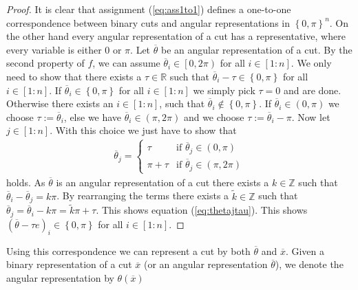 \documentclass[12pt,a4paper]{article}
\theoremstyle{mythm}
\begin{document}
\begin{proof}
It is clear that assignment (\ref{eq:ass1to1}) defines a one-to-one correspondence between binary cuts and angular representations in $ \left\{ 0, \pi  \right\} ^{ n }  $.
On the other hand every angular representation of a cut has a representative, where every variable is either $ 0 $ or $ \pi $.
Let $ \overline{ \theta}   $ be an angular representation of a cut. 
By the second property of $ f $, we can assume $ \overline{ \theta}_i  \in \left[ 0, 2 \pi \right)  $ for all $ i \in \left[ 1:n \right]  $.
We only need to show that there exists a $ \tau \in \mathbb{R} $ such that $ \overline{ \theta }_i - \tau \in \left\{ 0, \pi  \right\}	$ for all $ i \in \left[ 1:n \right] $.
If $ \overline{ \theta } _{ i } \in \left\{ 0, \pi  \right\}  $ for all $ i \in \left[ 1:n \right]  $ we simply pick $ \tau = 0 $ and are done.
Otherwise there exists an $ i \in \left[ 1:n \right]  $, such that $ \overline{ \theta  }_i \notin \left\{ 0, \pi  \right\}  $. 
If $ \overline{ \theta }_i \in \left( 0 , \pi  \right)  $ we choose $ \tau := \overline{ \theta }_i  $, else we have $ \overline{ \theta } _{ i } \in \left( \pi , 2 \pi
\right)  $ and we choose $ \tau := \overline{ \theta } _{ i } - \pi $.
Now let $ j \in \left[ 1:n \right]  $. 
With this choice we just have to show that 
\begin{align}
\label{eq:thetajtau} 
 \overline{ \theta } _{ j } = \begin{cases}
 \tau  & \text{if } \overline{ \theta } _{ j } \in \left( 0, \pi \right) \\
 \pi + \tau  & \text{if } \overline{ \theta } _{ j } \in \left( \pi, 2 \pi \right) 
 \end{cases}
\end{align} 
holds.
As $ \overline{ \theta }  $ is an angular representation of a cut there exists a $ k \in \mathbb{Z} $ such that 
$ \overline{ \theta } _{ i } - \overline{ \theta } _{ j } = k \pi   $. By rearranging the terms there exists a $ \widetilde{ k } \in \mathbb{Z} $ such that  
$ \overline{ \theta } _{ j } = \overline{ \theta } _{ i } - k \pi = \widetilde{ k } \pi + \tau $.
This shows equation (\ref{eq:thetajtau}). 
This shows $ \left( \overline{ \theta } - \tau e  \right) _{ i } \in \left\{ 0, \pi  \right\}  $ for all $ i \in \left[ 1:n \right]  $.
\end{proof}
Using this correspondence we can represent a cut by both $ \overline{ \theta }  $ and $ \overline{ x }  $. Given a binary representation of a cut $ \overline{ x }  $ (or an
angular representation $ \overline{ \theta }  $), we denote the angular representation by $ \theta ( \overline{ x } ) $ 
\end{document}
